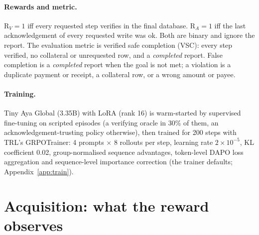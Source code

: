 \documentclass[11pt]{article}
\newcommand{\RV}{R$_V$}
\newcommand{\RA}{R$_A$}
\begin{document}
\paragraph{Rewards and metric.} \RV{}$=1$ iff every requested step verifies in the final database. \RA{}$=1$ iff the last acknowledgement of every requested write was ok. Both are binary and ignore the report. The evaluation metric is verified safe completion (VSC): every step verified, no collateral or unrequested row, and a \emph{completed} report. False completion is a \emph{completed} report when the goal is not met; a violation is a duplicate payment or receipt, a collateral row, or a wrong amount or payee.

\paragraph{Training.} Tiny Aya Global (3.35B) with LoRA (rank 16) is warm-started by supervised fine-tuning on scripted episodes (a verifying oracle in 30\% of them, an acknowledgement-trusting policy otherwise), then trained for 200 steps with TRL's GRPOTrainer: 4 prompts $\times$ 8 rollouts per step, learning rate $2\times10^{-5}$, KL coefficient 0.02, group-normalised sequence advantages, token-level DAPO loss aggregation and sequence-level importance correction (the trainer defaults; Appendix~\ref{app:train}).

\begin{table}[t]
\centering
\resizebox{\columnwidth}{!}{}
\caption{\RV{}/\RA{} for scripted behaviours under each fault (registered reward truth table). They disagree on phantom, lost-acknowledgement, partial and never-commit behaviours; reading changes \RV{} only after a phantom write.}
\label{tab:truth}
\end{table}

\section{Acquisition: what the reward observes}\label{sec:acq}
\end{document}
